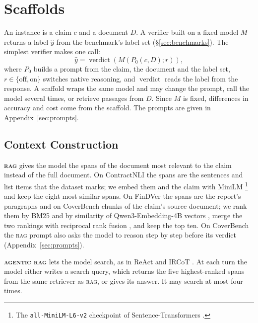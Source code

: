\documentclass[11pt]{article}
\begin{document}
\section{Scaffolds}
\label{sec:scaffolds}
\label{sec:baselines}
\label{sec:problem}

An instance is a claim $c$ and a document $D$. A verifier built on a fixed
model $M$ returns a label $\hat{y}$ from the benchmark's label set
(\S\ref{sec:benchmarks}). The simplest verifier makes one call:
\begin{equation}
    \hat{y}=\operatorname{verdict}\!\left(M(P_0(c,D);r)\right),
    \label{eq:verification}
\end{equation}
where $P_0$ builds a prompt from the claim, the document and the label set,
$r\in\{\mathrm{off},\mathrm{on}\}$ switches native reasoning, and
$\operatorname{verdict}$ reads the label from the response. A scaffold
wraps the same model and may change the prompt, call the model several
times, or retrieve passages from $D$. Since $M$ is fixed, differences in
accuracy and cost come from the scaffold. The prompts are given in
Appendix~\ref{sec:prompts}.

\subsection{Context Construction}
\label{sec:context-construction}

\noindent \textbf{\textsc{rag}} \citep{lewis2020rag} gives the model the
spans of the document most relevant to the claim instead of the full
document. On ContractNLI the spans are the sentences and list items that
the dataset marks; we embed them and the claim with MiniLM
\citep{wang2020minilm}\footnote{The \texttt{all-MiniLM-L6-v2} checkpoint
of Sentence-Transformers \citep{reimers2019sbert}.} and keep the eight
most similar spans. On FinDVer the spans are the report's paragraphs and
on CoverBench chunks of the claim's source document; we rank them by BM25
\citep{robertson2009bm25} and by similarity of Qwen3-Embedding-4B vectors
\citep{zhang2025qwen3embedding}, merge the two rankings with reciprocal
rank fusion \citep{cormack2009rrf}, and keep the top ten. On CoverBench the
\textsc{rag} prompt also asks the model to reason step by step before its
verdict (Appendix~\ref{sec:prompts}).

\noindent \textbf{\textsc{agentic rag}} \citep{singh2025agenticrag} lets the
model search, as in ReAct \citep{yao2023react} and IRCoT
\citep{trivedi2023ircot}. At each turn the model either writes a search
query, which returns the five highest-ranked spans from the same retriever
as \textsc{rag}, or gives its answer. It may search at most four times.
\end{document}
